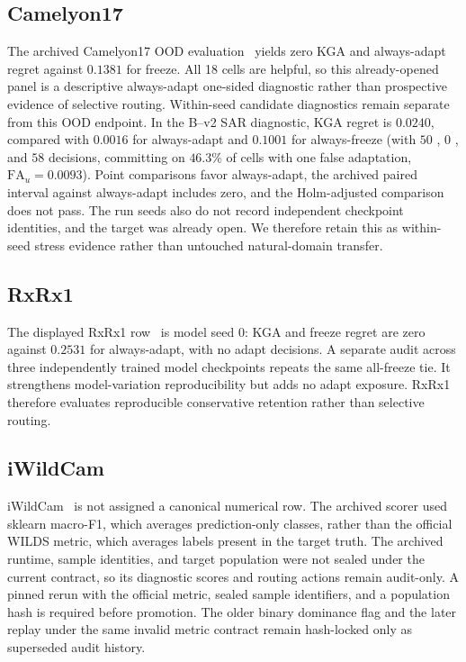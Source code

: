 \subsection{Camelyon17}

The archived Camelyon17 OOD evaluation~\cite{bandi2019camelyon} yields zero KGA and always-adapt regret against $0.1381$ for
freeze. All 18 cells are helpful, so this already-opened panel is a descriptive always-adapt
one-sided diagnostic rather than prospective evidence of selective routing. Within-seed candidate
diagnostics remain separate from this OOD endpoint. In the B--v2 SAR diagnostic, KGA regret is
$0.0240$, compared with $0.0016$ for always-adapt and $0.1001$ for always-freeze (with $50$ \adapt, $0$ \freeze, and $58$ \abstain decisions, committing on $46.3\%$ of cells with one false adaptation, $\mathrm{FA}_u = 0.0093$). Point comparisons favor always-adapt, the archived paired interval against
always-adapt includes zero, and the Holm-adjusted comparison does not pass. The run seeds also do not
record independent checkpoint identities, and the target was already open. We therefore retain this
as within-seed stress evidence rather than untouched natural-domain transfer.

\subsection{RxRx1}

The displayed RxRx1 row~\cite{taylor2019rxrx1} is model seed 0: KGA and freeze regret are zero against $0.2531$ for
always-adapt, with no adapt decisions. A separate audit across three independently trained model
checkpoints repeats the same all-freeze tie. It strengthens model-variation reproducibility but
adds no adapt exposure. RxRx1 therefore evaluates reproducible conservative retention rather than
selective routing.

\subsection{iWildCam}

iWildCam~\cite{koh2021wilds} is not assigned a canonical numerical row. The archived scorer used sklearn macro-F1,
which averages prediction-only classes, rather than the official WILDS metric, which averages labels
present in the target truth. The archived runtime, sample identities, and target population were not
sealed under the current contract, so its diagnostic scores and routing actions remain audit-only.
A pinned rerun with the official metric, sealed sample identifiers, and a population hash is required
before promotion. The older binary dominance flag and the later replay under the same invalid metric
contract remain hash-locked only as superseded audit history.

